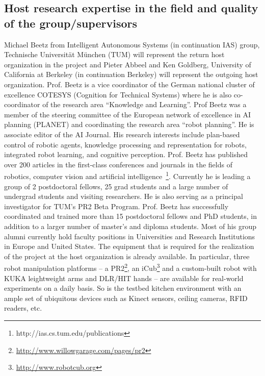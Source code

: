 \subsection{Host research expertise in the field and quality of the group/supervisors}
Michael Beetz from Intelligent Autonomous Systems (in continuation IAS) group, Technische Universit\"at 
M\"unchen (TUM) will represent the return host organization in the project and Pieter Abbeel and Ken
Goldberg, University of California at Berkeley (in continuation Berkeley) will represent
the outgoing host organization. 
Prof. Beetz is a vice coordinator of the German national cluster of excellence 
COTESYS (Cognition for Technical Systems) where he is also co-coordinator of the research area 
``Knowledge and Learning''. Prof Beetz was a member of the steering committee of the European 
network of excellence in AI planning (PLANET) and coordinating the research area ``robot planning''. 
He is associate editor of the AI Journal. His research interests include plan-based control of 
robotic agents, knowledge processing and representation for robots, integrated robot learning, and cognitive perception.
Prof. Beetz has published over 200 articles in the first-class conferences and
journals in the fields of robotics, computer vision and artificial 
intelligence~\footnote{http://ias.cs.tum.edu/publications}.
 Currently he is leading a group of 2 postdoctoral fellows, 25 grad students and a large number
of undergrad students and visiting researchers. He is also serving as a principal investigator 
for TUM's PR2 Beta Program. Prof. Beetz has successfully coordinated and trained 
more than 15 postdoctoral fellows and PhD students, in addition to a larger number of 
master's and diploma students. Most of his group alumni currently hold faculty positions in 
Universities and Research Institutions in Europe and United States.
The equipment that is required for the realization of the project at the host organization is already available. In
particular, three robot manipulation platforms -- a PR2\footnote{\url{http://www.willowgarage.com/pages/pr2}}, an
iCub\footnote{\url{http://www.robotcub.org}} and a custom-built robot
with KUKA leightweight arms and DLR/HIT hands -- are available for
real-world experiments on a daily basis. So is the testbed kitchen environment with an ample
set of ubiquitous devices such as Kinect sensors, ceiling cameras, RFID readers, etc.
\\
\begin{small}
\begin{multicols}{2}

\end{multicols}
\end{small}
\newpage